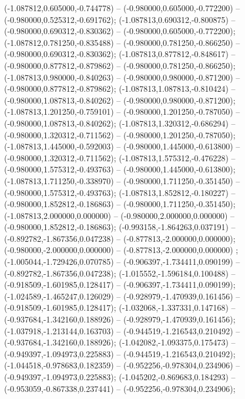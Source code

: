  (-1.087812,0.605000,-0.744778) -- (-0.980000,0.605000,-0.772200) -- (-0.980000,0.525312,-0.691762);
 (-1.087813,0.690312,-0.800875) -- (-0.980000,0.690312,-0.830362) -- (-0.980000,0.605000,-0.772200);
 (-1.087812,0.781250,-0.835488) -- (-0.980000,0.781250,-0.866250) -- (-0.980000,0.690312,-0.830362);
 (-1.087813,0.877812,-0.848617) -- (-0.980000,0.877812,-0.879862) -- (-0.980000,0.781250,-0.866250);
 (-1.087813,0.980000,-0.840263) -- (-0.980000,0.980000,-0.871200) -- (-0.980000,0.877812,-0.879862);
 (-1.087813,1.087813,-0.810424) -- (-0.980000,1.087813,-0.840262) -- (-0.980000,0.980000,-0.871200);
 (-1.087813,1.201250,-0.759101) -- (-0.980000,1.201250,-0.787050) -- (-0.980000,1.087813,-0.840262);
 (-1.087813,1.320312,-0.686294) -- (-0.980000,1.320312,-0.711562) -- (-0.980000,1.201250,-0.787050);
 (-1.087813,1.445000,-0.592003) -- (-0.980000,1.445000,-0.613800) -- (-0.980000,1.320312,-0.711562);
 (-1.087813,1.575312,-0.476228) -- (-0.980000,1.575312,-0.493763) -- (-0.980000,1.445000,-0.613800);
 (-1.087813,1.711250,-0.338970) -- (-0.980000,1.711250,-0.351450) -- (-0.980000,1.575312,-0.493763);
 (-1.087813,1.852812,-0.180227) -- (-0.980000,1.852812,-0.186863) -- (-0.980000,1.711250,-0.351450);
 (-1.087813,2.000000,0.000000) -- (-0.980000,2.000000,0.000000) -- (-0.980000,1.852812,-0.186863);
 (-0.993158,-1.864263,0.037191) -- (-0.892782,-1.867356,0.047238) -- (-0.877813,-2.000000,0.000000);
 (-0.980000,-2.000000,0.000000) -- (-0.877813,-2.000000,0.000000) ;
 (-1.005044,-1.729426,0.070785) -- (-0.906397,-1.734411,0.090199) -- (-0.892782,-1.867356,0.047238);
 (-1.015552,-1.596184,0.100488) -- (-0.918509,-1.601985,0.128417) -- (-0.906397,-1.734411,0.090199);
 (-1.024589,-1.465247,0.126029) -- (-0.928979,-1.470939,0.161456) -- (-0.918509,-1.601985,0.128417);
 (-1.032068,-1.337331,0.147168) -- (-0.937684,-1.342160,0.188926) -- (-0.928979,-1.470939,0.161456);
 (-1.037918,-1.213144,0.163703) -- (-0.944519,-1.216543,0.210492) -- (-0.937684,-1.342160,0.188926);
 (-1.042082,-1.093375,0.175473) -- (-0.949397,-1.094973,0.225883) -- (-0.944519,-1.216543,0.210492);
 (-1.044518,-0.978683,0.182359) -- (-0.952256,-0.978304,0.234906) -- (-0.949397,-1.094973,0.225883);
 (-1.045202,-0.869683,0.184293) -- (-0.953059,-0.867338,0.237441) -- (-0.952256,-0.978304,0.234906);
